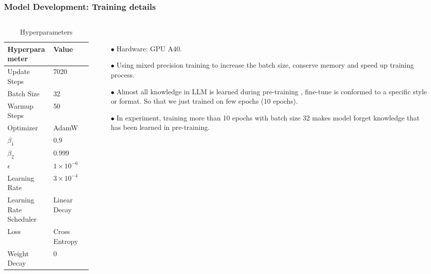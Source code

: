 \documentclass[10pt]{beamer}
\begin{document}
\begin{frame}
\frametitle{Model Development: Training details}

\begin{columns}[T] %
\begin{column}{0.6\textwidth} %
\begin{table}
\begin{tabular}{ll}
\toprule
\textbf{Hyperparameter} & \textbf{Value}\\
\midrule
Update Steps & 7020  \\ 
Batch Size & 32 \\ 
Warmup Steps & 50  \\ 
Optimizer & AdamW  \\ 
$\beta_1$ & 0.9  \\
$\beta_2$ & 0.999  \\
$\epsilon$ & $1\times 10^{-6}$  \\
Learning Rate & $3\times 10^{-4}$ \\
Learning Rate Scheduler & Linear Decay \\
Loss & Cross Entropy \\
Weight Decay & 0  \\
\bottomrule
\end{tabular}
\caption{Hyperparameters}
\end{table}
\end{column}

\begin{column}{0.45\textwidth} %
\vspace*{-10pt}
    \
    \begin{itemize}
    \item[\textcolor{black}{$\bullet$}] Hardware: GPU A40.
    \item[\textcolor{black}{$\bullet$}] Using mixed precision training to increase the batch size, conserve memory and speed up training process.
    \item[\textcolor{black}{$\bullet$}] Almost all knowledge in LLM is learned during pre-training \footfullcite{lima}, fine-tune is conformed to a specific style or format. So that we just trained on few epochs (10 epochs). 
    \item[\textcolor{black}{$\bullet$}] In experiment, training more than 10 epochs with batch size 32 makes model forget knowledge that has been learned in pre-training.
    \end{itemize}
    
\vspace*{\fill}

\end{column}
\end{columns}

\end{frame}
\end{document}
